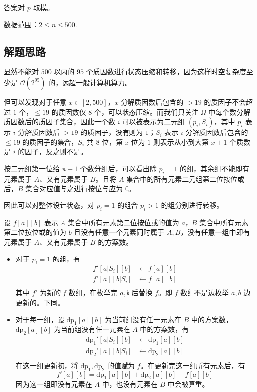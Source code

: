 答案对 \(p\) 取模。

数据范围：\(2\le n\le 500\).

\subsection{解题思路}

显然不能对 \(500\) 以内的 \(95\)
个质因数进行状态压缩和转移，因为这样时空复杂度至少是
\(\mathcal{O}(2^{95})\) 的，远超一般计算机算力。

但可以发现对于任意 \(x\in[2,500]\)，\(x\) 分解质因数后包含的 \(> 19\)
的质因子不会超过 \(1\) 个，\(\le19\) 的质因数仅 \(8\)
个，可以状态压缩。而我们只关注 \(\Omega\)
中每个数分解质因数后的质因子集合，因此一个数 \(i\) 可以被表示为二元组
\((p_i,S_i)\)，其中 \(p_i\) 表示 \(i\) 分解质因数后 \(> 19\)
的质因子，没有则为 \(1\)；\(S_i\) 表示 \(i\) 分解质因数后包含的
\(\le19\) 的质因子的集合，\(S_i\) 共 \(8\) 位，第 \(x\) 位为 \(1\)
则表示从小到大第 \(x+1\) 个质数是 \(i\) 的因子，反之则不是。

按二元组第一位给 \(n-1\) 个数分组后，可以看出除 \(p_i=1\)
的组，其余组不能即有元素属于 \(A\)、又有元素属于 \(B\)。且将 \(A\)
集合中的所有元素二元组第二位按位或后，\(B\) 集合对应值与之进行按位与应为
\(0\)。

因此可以对整体设计状态，对 \(p_i=1\) 的组合 \(p_i > 1\)
的组分别进行转移。

设 \(f[a][b]\) 表示 \(A\) 集合中所有元素第二位按位或的值为 \(a\)，\(B\)
集合中所有元素第二位按位或的值为 \(b\) 且没有任意一个元素同时属于
\(A,B\)，没有任意一组中即有元素属于 \(A\)、又有元素属于 \(B\) 的方案数。

\begin{itemize}
\item
  对于 \(p_i=1\) 的组，有 \[
  \begin{aligned}
  f'[a|S_i][b]&\leftarrow f[a][b]\\
  f'[a][b|S_i]&\leftarrow f[a][b]\\
  \end{aligned}
  \] 其中 \(f'\) 为新的 \(f\) 数组，在枚举完 \(a,b\) 后替换 \(f\)。即
  \(f\) 数组不是边枚举 \(a,b\) 边更新的。下同。
\item
  对于每一组，设 \(\operatorname{dp_1}[a][b]\) 为当前组没有任一元素在
  \(B\) 中的方案数， \(\operatorname{dp_2}[a][b]\)
  为当前组没有任一元素在 \(A\) 中的方案数，有 \[
  \begin{aligned}
  \operatorname{dp_1}'[a|S_i][b]&\leftarrow \operatorname{dp_1}[a][b]\\
  \operatorname{dp_2}'[a][b|S_i]&\leftarrow \operatorname{dp_2}[a][b]\\
  \end{aligned}
  \] 在这一组更新初，将 \(\operatorname{dp_1},\operatorname{dp_2}\)
  的值赋为 \(f\)。在更新完这一组所有元素后，有 \[
  f'[a][b]=\operatorname{dp_1}[a][b]+\operatorname{dp_2}[a][b]-f[a][b]
  \] 因为这一组即没有元素在 \(A\) 中，也没有元素在 \(B\) 中会被算重。
\end{itemize}

